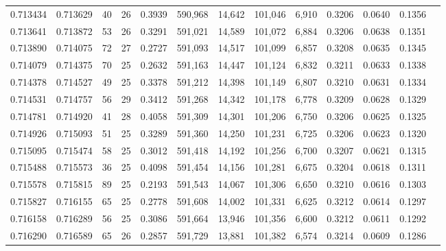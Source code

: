 \begin{tabular}{rrrrrrrrrrrrr}
0.713434 & 0.713629 &  40 &  26 &                                     0.3939 & 590,968 &  14,642 & 101,046 &   6,910 & 0.3206 & 0.0640 & 0.1356 \\
0.713641 & 0.713872 &  53 &  26 &                                     0.3291 & 591,021 &  14,589 & 101,072 &   6,884 & 0.3206 & 0.0638 & 0.1351 \\
0.713890 & 0.714075 &  72 &  27 &                                     0.2727 & 591,093 &  14,517 & 101,099 &   6,857 & 0.3208 & 0.0635 & 0.1345 \\
0.714079 & 0.714375 &  70 &  25 &                                     0.2632 & 591,163 &  14,447 & 101,124 &   6,832 & 0.3211 & 0.0633 & 0.1338 \\
0.714378 & 0.714527 &  49 &  25 &                                     0.3378 & 591,212 &  14,398 & 101,149 &   6,807 & 0.3210 & 0.0631 & 0.1334 \\
0.714531 & 0.714757 &  56 &  29 &                                     0.3412 & 591,268 &  14,342 & 101,178 &   6,778 & 0.3209 & 0.0628 & 0.1329 \\
0.714781 & 0.714920 &  41 &  28 &                                     0.4058 & 591,309 &  14,301 & 101,206 &   6,750 & 0.3206 & 0.0625 & 0.1325 \\
0.714926 & 0.715093 &  51 &  25 &                                     0.3289 & 591,360 &  14,250 & 101,231 &   6,725 & 0.3206 & 0.0623 & 0.1320 \\
0.715095 & 0.715474 &  58 &  25 &                                     0.3012 & 591,418 &  14,192 & 101,256 &   6,700 & 0.3207 & 0.0621 & 0.1315 \\
0.715488 & 0.715573 &  36 &  25 &                                     0.4098 & 591,454 &  14,156 & 101,281 &   6,675 & 0.3204 & 0.0618 & 0.1311 \\
0.715578 & 0.715815 &  89 &  25 &                                     0.2193 & 591,543 &  14,067 & 101,306 &   6,650 & 0.3210 & 0.0616 & 0.1303 \\
0.715827 & 0.716155 &  65 &  25 &                                     0.2778 & 591,608 &  14,002 & 101,331 &   6,625 & 0.3212 & 0.0614 & 0.1297 \\
0.716158 & 0.716289 &  56 &  25 &                                     0.3086 & 591,664 &  13,946 & 101,356 &   6,600 & 0.3212 & 0.0611 & 0.1292 \\
0.716290 & 0.716589 &  65 &  26 &                                     0.2857 & 591,729 &  13,881 & 101,382 &   6,574 & 0.3214 & 0.0609 & 0.1286 \\

\end{tabular}
